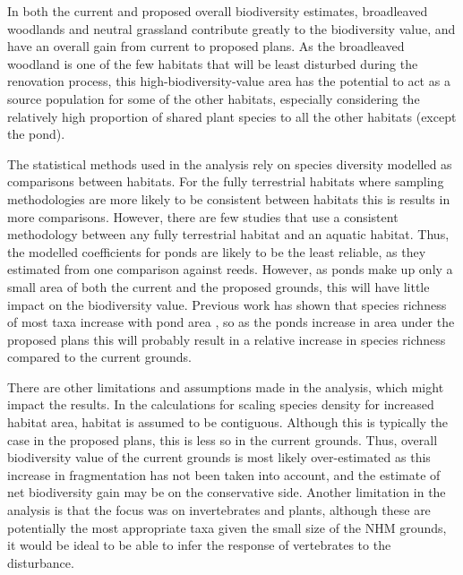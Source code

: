 In both the current and proposed overall biodiversity estimates, broadleaved woodlands and neutral grassland contribute greatly to the biodiversity value, and have an overall gain from current to proposed plans. As the broadleaved woodland is one of the few habitats that will be least disturbed during the renovation process, this high-biodiversity-value area has the potential to act as a source population for some of the other habitats, especially considering the relatively high proportion of shared plant species to all the other habitats (except the pond).

The statistical methods used in the analysis rely on species diversity modelled as comparisons between habitats. For the fully terrestrial habitats where sampling methodologies are more likely to be consistent between habitats this is results in more comparisons. However, there are few studies that use a consistent methodology between any fully terrestrial habitat and an aquatic habitat. Thus, the modelled coefficients for ponds are likely to be the least reliable, as they estimated from one comparison against reeds. However, as ponds make up only a small area of both the current and the proposed grounds, this will have little impact on the biodiversity value. Previous work has shown that species richness of most taxa increase with pond area \citep{Oertli:2002bc,Parris:2006jae}, so as the ponds increase in area under the proposed plans this will probably result in a relative increase in species richness compared to the current grounds.

There are other limitations and assumptions made in the analysis, which might impact the results.  In the calculations for scaling species density for increased habitat area, habitat is assumed to be contiguous. Although this is typically the case in the proposed plans, this is less so in the current grounds. Thus, overall biodiversity value of the current grounds is most likely over-estimated as this increase in fragmentation has not been taken into account, and the estimate of net biodiversity gain may be on the conservative side.  Another limitation in the analysis is that the focus was on invertebrates and plants, although these are potentially the most appropriate taxa given the small size of the NHM grounds, it would be ideal to be able to infer the response of vertebrates to the disturbance.

